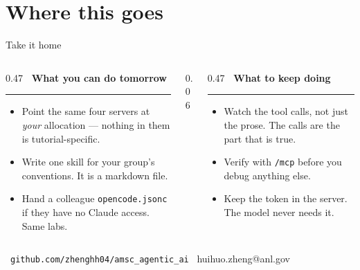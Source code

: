 \documentclass[aspectratio=169,11pt]{beamer}
\makeatletter
\newcommand{\deckemail}{huihuo.zheng@anl.gov}
\newcommand{\sechead}[2]{{\small\color{#1}\bfseries #2}\par\vspace{1.5pt}%
  {\color{#1!45}\rule{\linewidth}{0.6pt}}\par\vspace{4pt}}
\makeatother
\begin{document}
\section{Where this goes}

\begin{frame}{Take it home}
  \begin{columns}[T,totalwidth=\textwidth]
    \begin{column}{0.47\textwidth}
      \sechead{accentteal}{\faRocket\ What you can do tomorrow}
      \scriptsize
      \begin{itemize}\setlength\itemsep{3pt}
        \item[\faPlug] Point the same four servers at \emph{your} allocation
          --- nothing in them is tutorial-specific.
        \item[\faFileCode] Write one skill for your group's conventions. It is
          a markdown file.
        \item[\faRobot] Hand a colleague \texttt{opencode.jsonc} if they have
          no Claude access. Same labs.
      \end{itemize}
    \end{column}
    \begin{column}{0.06\textwidth}\end{column}
    \begin{column}{0.47\textwidth}
      \sechead{labnavy}{\faUserShield\ What to keep doing}
      \scriptsize
      \begin{itemize}\setlength\itemsep{3pt}
        \item[\faEye] Watch the tool calls, not just the prose. The calls are
          the part that is true.
        \item[\faCheckCircle] Verify with \texttt{/mcp} before you debug
          anything else.
        \item[\faKey] Keep the token in the server. The model never needs it.
      \end{itemize}
    \end{column}
  \end{columns}
  \vspace{7pt}
  \begin{center}
    {\small\color{midgray}\faGithub\
     \texttt{github.com/zhenghh04/amsc\_agentic\_ai}
     \quad\textperiodcentered\quad \faEnvelope[regular]\ \deckemail}
  \end{center}
\end{frame}
\end{document}

